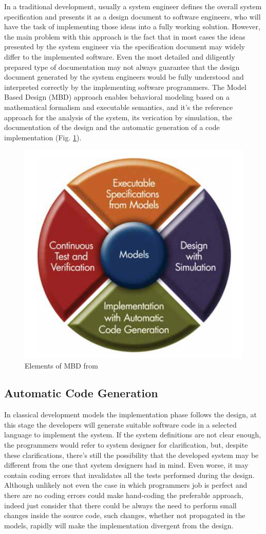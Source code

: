 In a traditional development, usually a system engineer defines the overall system specification and presents it as a design document to software engineers, who will have the task of implementing those ideas into a fully working solution. However, the main problem with this approach is the fact that in most cases the ideas presented by the system engineer via the specification document may widely differ to the implemented software. Even the most detailed and diligently prepared type of documentation may not always guarantee that the design document generated by the system engineers would be fully understood and interpreted correctly by the implementing software programmers. The Model Based Design (MBD) approach enables behavioral modeling based on a mathematical formalism and executable semantics, and it's the reference approach for the analysis of the system, its verication by simulation, the documentation of the design and the automatic generation of a code implementation (Fig. \ref{fig:elMBD}). 

\begin{figure}[!h]
	\centering 
     \includegraphics[width=.5\textwidth]{Figs/elementsMBD.PNG} 
     \caption{Elements of MBD from \citep{behboodian2006model}}
     \label{fig:elMBD} 
\end{figure} 

\subsection{Automatic Code Generation}

In classical development models the implementation phase follows the design, at this stage the developers will generate suitable software code in a selected language to implement the system. If the system definitions are not clear enough, the programmers would refer to system designer for clarification, but, despite these clarifications, there's still the possibility that the developed system may be different from the one that system designers had in mind. Even worse, it may contain coding errors that invalidates all the tests performed during the design. Although unlikely not even the case in which programmers job is perfect and there are no coding errors could make hand-coding the preferable approach, indeed just consider that there could be always the need to perform small changes inside the source code, such changes, whether not propagated in the models, rapidly will make the implementation divergent from the design. 
